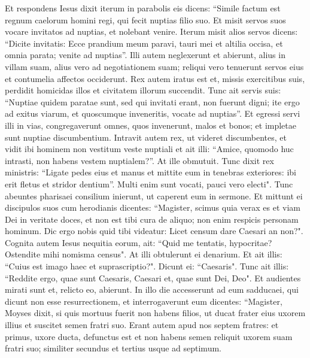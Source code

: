 \begin{biblechapter}  
\verse Et respondens Iesus dixit iterum in parabolis eis dicens: 
\verse “Simile factum est regnum caelorum homini regi, qui fecit nuptias filio suo. 
\verse Et misit servos suos vocare invitatos ad nuptias, et nolebant venire. 
\verse Iterum misit alios servos dicens: “Dicite invitatis: Ecce prandium meum paravi, tauri mei et altilia occisa, et omnia parata; venite ad nuptias”. 
\verse Illi autem neglexerunt et abierunt, alius in villam suam, alius vero ad negotiationem suam; 
\verse reliqui vero tenuerunt servos eius et contumelia affectos occiderunt. 
\verse Rex autem iratus est et, missis exercitibus suis, perdidit homicidas illos et civitatem illorum succendit. 
\verse Tunc ait servis suis: “Nuptiae quidem paratae sunt, sed qui invitati erant, non fuerunt digni; 
\verse ite ergo ad exitus viarum, et quoscumque inveneritis, vocate ad nuptias”. 
\verse Et egressi servi illi in vias, congregaverunt omnes, quos invenerunt, malos et bonos; et impletae sunt nuptiae discumbentium. 
\verse Intravit autem rex, ut videret discumbentes, et vidit ibi hominem non vestitum veste nuptiali 
\verse et ait illi: “Amice, quomodo huc intrasti, non habens vestem nuptialem?”. At ille obmutuit. 
\verse Tunc dixit rex ministris: “Ligate pedes eius et manus et mittite eum in tenebras exteriores: ibi erit fletus et stridor dentium”. 
\verse Multi enim sunt vocati, pauci vero electi". 
\verse Tunc abeuntes pharisaei consilium inierunt, ut caperent eum in sermone.  
\verse Et mittunt ei discipulos suos cum herodianis dicentes: “Magister, scimus quia verax es et viam Dei in veritate doces, et non est tibi cura de aliquo; non enim respicis personam hominum. 
\verse Dic ergo nobis quid tibi videatur: Licet censum dare Caesari an non?". 
\verse Cognita autem Iesus nequitia eorum, ait: “Quid me tentatis, hypocritae? 
\verse Ostendite mihi nomisma census". At illi obtulerunt ei denarium. 
\verse Et ait illis: “Cuius est imago haec et suprascriptio?". 
\verse Dicunt ei: “Caesaris". Tunc ait illis: “Reddite ergo, quae sunt Caesaris, Caesari et, quae sunt Dei, Deo". 
\verse Et audientes mirati sunt et, relicto eo, abierunt. 
\verse In illo die accesserunt ad eum sadducaei, qui dicunt non esse resurrectionem, et interrogaverunt eum 
\verse dicentes: “Magister, Moyses dixit, si quis mortuus fuerit non habens filios, ut ducat frater eius uxorem illius et suscitet semen fratri suo. 
\verse Erant autem apud nos septem fratres: et primus, uxore ducta, defunctus est et non habens semen reliquit uxorem suam fratri suo; 
\verse similiter secundus et tertius usque ad septimum. 

\end{biblechapter}
